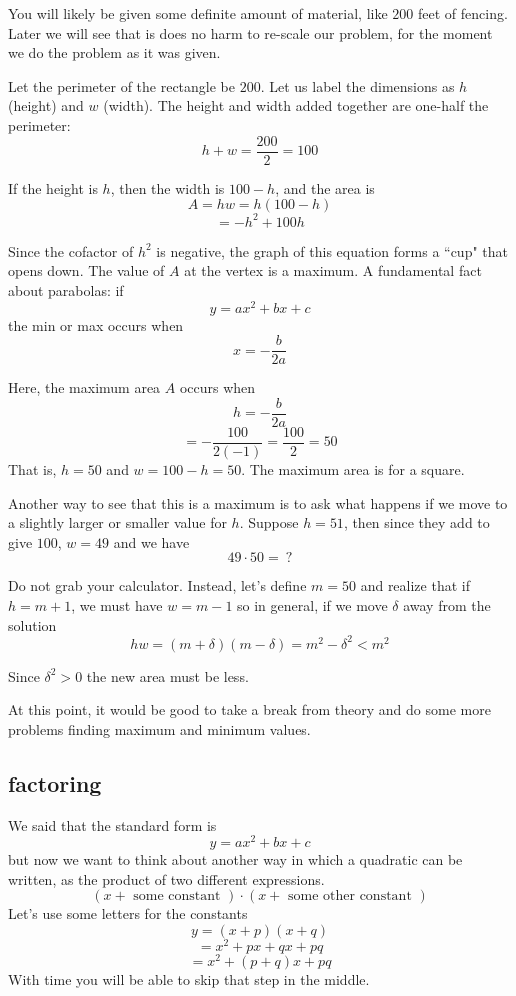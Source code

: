 \documentclass[11pt, oneside]{article}
\begin{document}
You will likely be given some definite amount of material, like $200$ feet of fencing.  Later we will see that is does no harm to re-scale our problem, for the moment we do the problem as it was given.

Let the perimeter of the rectangle be $200$.  Let us label the dimensions as $h$ (height) and $w$ (width).  The height and width added together are one-half the perimeter:
\[  h + w = \frac{200}{2} = 100 \]

If the height is $h$, then the width is $100 - h$, and the area is
\[ A = hw = h(100 - h) \]
\[ = -h^2 + 100 h \]

Since the cofactor of $h^2$ is negative, the graph of this equation forms a ``cup" that opens down.  The value of $A$ at the vertex is a maximum.  A fundamental fact about parabolas:   if 
\[ y = ax^2 + bx + c \]
the min or max occurs when
\[ x = - \frac{b}{2a} \]

Here, the maximum area $A$ occurs when
\[ h = - \frac{b}{2a} \]
\[ =  - \frac{100}{2(-1)} = \frac{100}{2} = 50 \]
That is, $h = 50$ and $w = 100 - h = 50$.  The maximum area is for a square.

Another way to see that this is a maximum is to ask what happens if we move to a slightly larger or smaller value for $h$.  Suppose $h = 51$, then since they add to give $100$, $w = 49$ and we have
\[ 49 \cdot 50 = \ ? \]

Do not grab your calculator.  Instead, let's define $m = 50$ and realize that if $h = m + 1$, we must have $w = m - 1$ so in general, if we move $\delta$ away from the solution 
\[ hw = (m + \delta)(m -  \delta) = m^2 -  \delta^2 < m^2 \]

Since $\delta^2 > 0$ the new area must be less.

At this point, it would be good to take a break from theory and do some more problems finding maximum and minimum values.  


\subsection*{factoring}

We said that the standard form is
\[ y = ax^2 + bx + c \]
but now we want to think about another way in which a quadratic can be written, as the product of two different expressions.
\[ (x + \text{ some constant } ) \cdot  (x + \text{ some other constant } ) \]
Let's use some letters for the constants
\[ y = (x + p)(x + q) \]
\[ = x^2 + px + qx + pq \]
\[ = x^2 + (p + q)x + pq \]
With time you will be able to skip that step in the middle.
\end{document}
